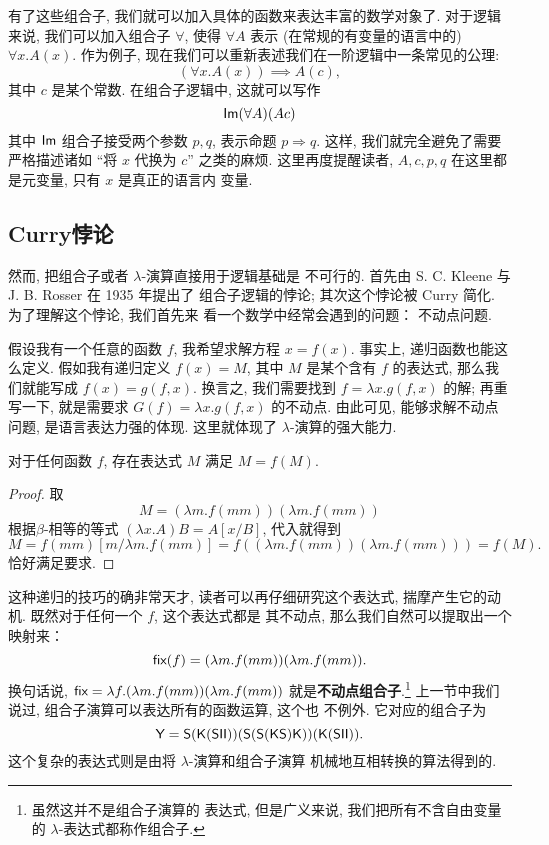 有了这些组合子, 我们就可以加入具体的函数来表达丰富的数学对象了.
对于逻辑来说, 我们可以加入组合子 \(\forall\), 使得
\(\forall A\) 表示 (在常规的有变量的语言中的) \(\forall x. A(x)\).
作为例子, 现在我们可以重新表述我们在一阶逻辑中一条常见的公理:
\[(\forall x. A(x)) \implies A(c),\]
其中 \(c\) 是某个常数. 在组合子逻辑中, 这就可以写作
\[\textsf{Im}(\forall A)(A c)\]
其中 \(\textsf{Im}\) 组合子接受两个参数 \(p, q\), 表示命题
\(p \Rightarrow q\). 这样, 我们就完全避免了需要严格描述诸如
“将 \(x\) 代换为 \(c\)” 之类的麻烦. 这里再度提醒读者,
\(A, c, p, q\) 在这里都是元变量, 只有 \(x\) 是真正的语言内
变量.

\subsection{Curry悖论}
然而, 把组合子或者 \(\lambda\)-演算直接用于逻辑基础是
不可行的. 首先由 S. C. Kleene 与 J. B. Rosser 在 1935 年提出了
组合子逻辑的悖论; 其次这个悖论被 Curry 简化. 为了理解这个悖论, 我们首先来
看一个数学中经常会遇到的问题： 不动点问题.

假设我有一个任意的函数 \(f\), 我希望求解方程 \(x = f(x)\).
事实上, 递归函数也能这么定义. 假如我有递归定义 \(f(x) = M\),
其中 \(M\) 是某个含有 \(f\) 的表达式, 那么我们就能写成
\(f(x) = g(f,x)\). 换言之, 我们需要找到 \(f = \lambda x. g(f,x)\)
的解; 再重写一下, 就是需要求 \(G(f) = \lambda x. g(f,x)\)
的不动点. 由此可见, 能够求解不动点问题, 是语言表达力强的体现.
这里就体现了 \(\lambda\)-演算的强大能力.

\begin{theorem}
对于任何函数 \(f\),
存在表达式 \(M\) 满足 \(M=f(M)\).
\end{theorem}
\begin{proof}
取
\[M = (\lambda m. f(mm))(\lambda m. f(mm))\]
根据\(\beta\)-相等的等式 \((\lambda x. A)B = A[x/B]\),
代入就得到
\[M = f(mm)[m/\lambda m.f(mm)]
= f((\lambda m. f(mm))(\lambda m.f(mm)))
= f(M).\]
恰好满足要求.
\end{proof}
这种递归的技巧的确非常天才, 读者可以再仔细研究这个表达式,
揣摩产生它的动机. 既然对于任何一个 \(f\), 这个表达式都是
其不动点, 那么我们自然可以提取出一个映射来：
\[\textsf{fix}(f) = (\lambda m. f(mm)) (\lambda m. f(mm)).\]
换句话说, \(\textsf{fix} = \lambda f. (\lambda m. f(mm)) (\lambda m. f(mm))\)
就是\textbf{不动点组合子}.\footnote{虽然这并不是组合子演算的
表达式, 但是广义来说, 我们把所有不含自由变量
的 \(\lambda\)-表达式都称作组合子.}
上一节中我们说过, 组合子演算可以表达所有的函数运算, 这个也
不例外. 它对应的组合子为
\[\textsf{Y} = \textsf{S}(\textsf{K}(\textsf{S}\textsf{I}\textsf{I}))
(\textsf{S}(\textsf{S}(\textsf{K}\textsf{S})\textsf{K}))
(\textsf{K}(\textsf{S}\textsf{I}\textsf{I})).\]
这个复杂的表达式则是由将 \(\lambda\)-演算和组合子演算
机械地互相转换的算法得到的.

